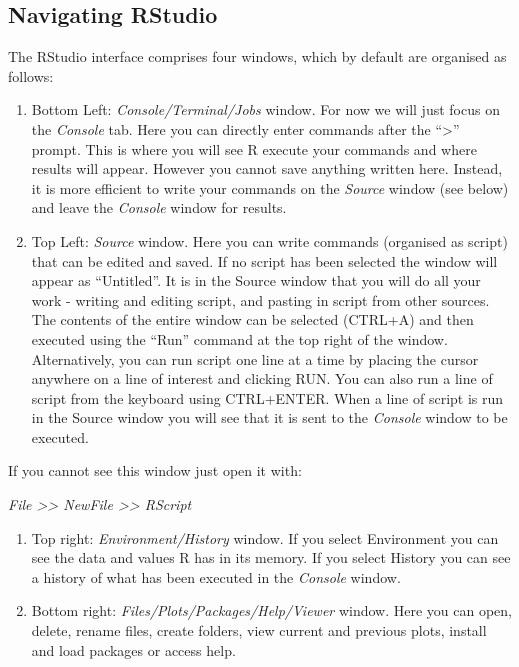 \documentclass[
]{book}
\begin{document}
\hypertarget{Rstudio}{%
\subsection{Navigating RStudio}\label{Rstudio}}

The RStudio interface comprises four windows, which by default are organised as follows:

\begin{enumerate}
\def\labelenumi{\arabic{enumi}.}
\item
  Bottom Left: \emph{Console/Terminal/Jobs} window. For now we will just focus on the \emph{Console} tab. Here you can directly enter commands after the ``\textgreater{}'' prompt. This is where you will see R execute your commands and where results will appear. However you cannot save anything written here. Instead, it is more efficient to write your commands on the \emph{Source} window (see below) and leave the \emph{Console} window for results.
\item
  Top Left: \emph{Source} window. Here you can write commands (organised as script) that can be edited and saved. If no script has been selected the window will appear as ``Untitled''. It is in the Source window that you will do all your work - writing and editing script, and pasting in script from other sources. The contents of the entire window can be selected (CTRL+A) and then executed using the ``Run'' command at the top right of the window. Alternatively, you can run script one line at a time by placing the cursor anywhere on a line of interest and clicking RUN. You can also run a line of script from the keyboard using CTRL+ENTER. When a line of script is run in the Source window you will see that it is sent to the \emph{Console} window to be executed.
\end{enumerate}

If you cannot see this window just open it with:

\emph{File \textgreater\textgreater{} NewFile \textgreater\textgreater{} RScript}

\begin{enumerate}
\def\labelenumi{\arabic{enumi}.}
\setcounter{enumi}{2}
\item
  Top right: \emph{Environment/History} window. If you select Environment you can see the data and values R has in its memory. If you select History you can see a history of what has been executed in the \emph{Console} window.
\item
  Bottom right: \emph{Files/Plots/Packages/Help/Viewer} window. Here you can open, delete, rename files, create folders, view current and previous plots, install and load packages or access help.
\end{enumerate}
\end{document}
